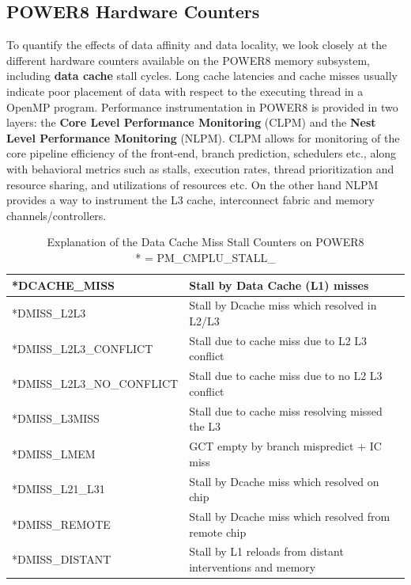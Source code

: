 \subsection{POWER8 Hardware Counters}
To quantify the effects of data affinity and data locality, we look closely at the different hardware counters available on the POWER8 memory subsystem, including \textbf{data cache} stall cycles. Long cache latencies and cache misses usually indicate poor placement of data with respect to the executing thread in a OpenMP program. Performance instrumentation in POWER8 is provided in two layers: the \textbf{Core Level Performance Monitoring} (CLPM) and the \textbf{Nest Level Performance Monitoring} (NLPM). CLPM allows for monitoring of the core pipeline efficiency of the front-end, branch prediction, schedulers etc., along with behavioral metrics such as stalls, execution rates, thread prioritization and resource sharing, and utilizations of resources etc. On the other hand NLPM provides a way to instrument the L3 cache, interconnect fabric and memory channels/controllers. 
%
\begin{table}[h]
\vspace{-0.5pc}
\centering
\begin{tabular} { | l | l |}
\hline
*DCACHE\_MISS & Stall by Data Cache (L1) misses\\  \hline
*DMISS\_L2L3 & Stall by Dcache miss which resolved in L2/L3 \\  \hline
*DMISS\_L2L3\_CONFLICT & Stall due to cache miss due to L2 L3 conflict \\  \hline
*DMISS\_L2L3\_NO\_CONFLICT & Stall due to cache miss due to no L2 L3 conflict \\ \hline
*DMISS\_L3MISS & Stall due to cache miss resolving missed the L3 \\ \hline
*DMISS\_LMEM & GCT empty by branch mispredict + IC miss\\ \hline
*DMISS\_L21\_L31 &  Stall by Dcache miss which resolved on chip \\ \hline%
*DMISS\_REMOTE  & Stall by Dcache miss which resolved from remote chip \\ \hline%
*DMISS\_DISTANT & Stall by L1 reloads from distant interventions and memory \\ \hline
 \end{tabular}
 \caption{Explanation of the Data Cache Miss Stall Counters on POWER8 \\ * = PM\_CMPLU\_STALL\_}
\label{tab:hwct}
\end{table}
